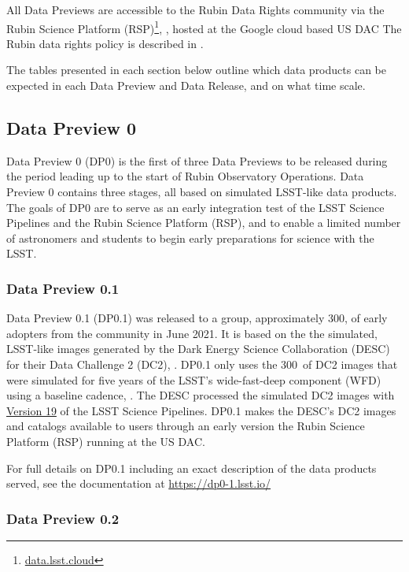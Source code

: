 All Data Previews are accessible to the Rubin Data Rights community via the Rubin Science Platform (RSP)\footnote{\url{data.lsst.cloud}}, \citep{LSE-319}, hosted at the Google cloud based  US DAC
The Rubin data rights policy is described in  \cite{RDO-013}.

The tables presented in each section below outline which data products can be expected in each Data Preview and Data Release, and on what time scale.

\subsection{Data Preview 0}

Data Preview 0 (DP0) is the first of three Data Previews to be released during the period leading up to the start of Rubin Observatory Operations. 
Data Preview 0 contains three stages, all based on simulated LSST-like data products. 
The goals of DP0 are to serve as an early integration test of the LSST Science Pipelines and the Rubin Science Platform (RSP), and to enable a limited number of astronomers and students to begin early preparations for science with the LSST.

\subsubsection{Data Preview 0.1}

Data Preview 0.1 (DP0.1) was released to a group, approximately 300,  of early adopters from the community in June 2021. 
It is based on the the simulated, LSST-like images generated by the Dark Energy Science Collaboration (DESC) for their Data Challenge 2 (DC2), \citep{2021ApJS..253...31L}. 
DP0.1 only uses the 300~\sqdeg of DC2 images that were simulated for five years of the LSST’s wide-fast-deep component (WFD) using a baseline cadence, .
The DESC processed the simulated DC2 images with \href{https://pipelines.lsst.io/v/v19_0_0/index.html}{Version 19} of the LSST Science Pipelines. 
DP0.1 makes the DESC’s DC2 images and catalogs available to users through an early version the Rubin Science Platform (RSP) running at the US DAC. 

For full details on DP0.1 including an exact description of the data products served, see the documentation at \url{https://dp0-1.lsst.io/}

\subsubsection{Data Preview 0.2}

